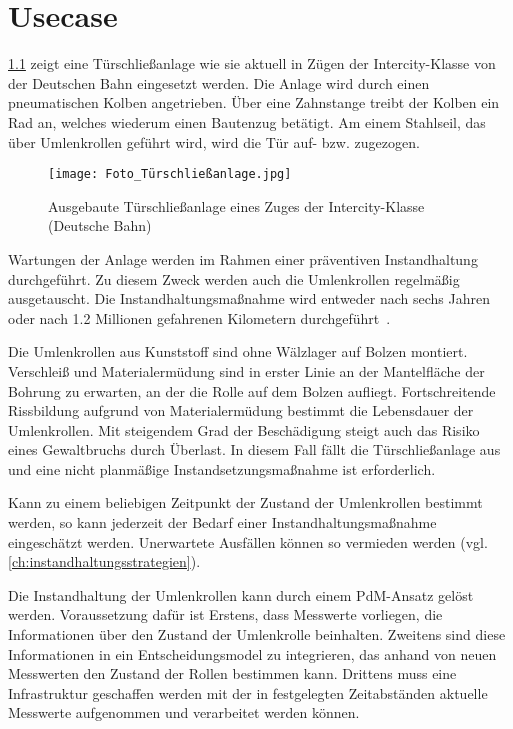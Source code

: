 \chapter{Usecase}
\label{ch:usecase}
\cref{fig:foto_tureschliessanlage} zeigt eine Türschließanlage wie sie aktuell in Zügen der Intercity-Klasse von der Deutschen Bahn eingesetzt werden. Die Anlage wird durch einen pneumatischen Kolben angetrieben. Über eine Zahnstange treibt der Kolben ein Rad an, welches wiederum einen Bautenzug betätigt. Am einem Stahlseil, das über Umlenkrollen geführt wird, wird die Tür auf- bzw. zugezogen.

\begin{figure}[ht]
	\centering
	\texttt{[image: Foto\_Türschließanlage.jpg]}
	\caption{Ausgebaute Türschließanlage eines Zuges der Intercity-Klasse (Deutsche Bahn)}
	\label{fig:foto_tureschliessanlage}
\end{figure}

Wartungen der Anlage werden im Rahmen einer präventiven Instandhaltung durchgeführt. Zu diesem Zweck werden auch die Umlenkrollen regelmäßig ausgetauscht. Die Instandhaltungsmaßnahme wird entweder nach sechs Jahren oder nach \num{1.2} Millionen gefahrenen Kilometern durchgeführt~\cite{db.2021}.

Die Umlenkrollen aus Kunststoff sind ohne Wälzlager auf Bolzen montiert. Verschleiß und Materialermüdung sind in erster Linie an der Mantelfläche der Bohrung zu erwarten, an der die Rolle auf dem Bolzen aufliegt. Fortschreitende Rissbildung aufgrund von Materialermüdung bestimmt die Lebensdauer der Umlenkrollen. Mit steigendem Grad der Beschädigung steigt auch das Risiko eines Gewaltbruchs durch Überlast. In diesem Fall fällt die Türschließanlage aus und eine nicht planmäßige Instandsetzungsmaßnahme ist erforderlich.

Kann zu einem beliebigen Zeitpunkt der Zustand der Umlenkrollen bestimmt werden, so kann jederzeit der Bedarf einer Instandhaltungsmaßnahme eingeschätzt werden. Unerwartete Ausfällen können so vermieden werden (vgl. \cref{ch:instandhaltungsstrategien}). 

Die Instandhaltung der Umlenkrollen kann durch einem PdM-Ansatz gelöst werden. Voraussetzung dafür ist Erstens, dass Messwerte vorliegen, die Informationen über den Zustand der Umlenkrolle beinhalten. Zweitens sind diese Informationen in ein Entscheidungsmodel zu integrieren, das anhand von neuen Messwerten den Zustand der Rollen bestimmen kann. Drittens muss eine Infrastruktur geschaffen werden mit der in festgelegten Zeitabständen aktuelle Messwerte aufgenommen und verarbeitet werden können.
